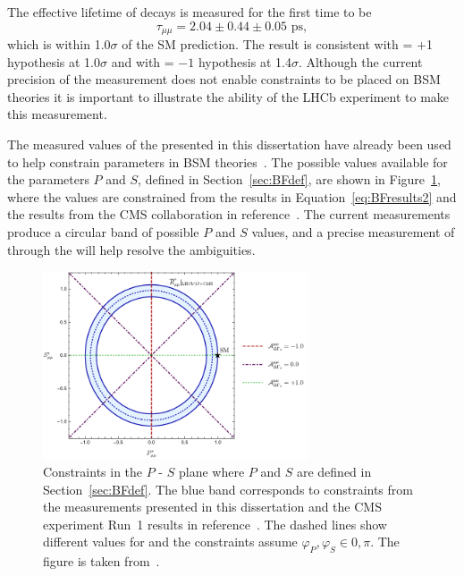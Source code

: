 The effective lifetime of \bsmumu decays is measured for the first time to be 
\begin{equation}
\tau_{\mu\mu} = 2.04 \pm 0.44 \pm 0.05 \text{ ps},
\end{equation}
which is within 1.0$\sigma$ of the SM prediction. The result is consistent with \ADG = +1 hypothesis at 1.0$\sigma$ and with \ADG = $-1$ hypothesis at 1.4$\sigma$. Although the current precision of the measurement does not enable constraints to be placed on BSM theories it is important to illustrate the ability of the LHCb experiment to make this measurement.

The measured values of the \BF presented in this dissertation have already been used to help constrain parameters in BSM theories~\cite{Altmannshofer:2017wqy,Fleischer:2017ltw,Bobeth:2017xry,Chiang:2017etj}. 
The possible values available for the parameters $P$ and $S$, defined in Section~\ref{sec:BFdef}, are shown in Figure~\ref{fig:NPcontss}, where the values are constrained from the \BF results in Equation~\ref{eq:BFresults2} and the results from the CMS collaboration in reference~\cite{Chatrchyan:2013bka}. The current measurements produce a circular band of possible $P$ and $S$ values, and a precise measurement of \ADG through the \bsmumu \el will help resolve the ambiguities.


\begin{figure}[tbp]
    \centering
        \includegraphics[width=0.7\textwidth]{./Figs/Summary/fig3.pdf}
    \caption{Constraints in the $P$ - $S$ plane where $P$ and $S$ are defined in Section~\ref{sec:BFdef}. The blue band corresponds to constraints from the \bmumu \BF measurements presented in this dissertation and the CMS experiment Run~1 results in reference~\cite{Chatrchyan:2013bka}. The dashed lines show different values for \ADG and the constraints assume $\varphi_{P}, \varphi_{S}\in {0, \pi}$. The figure is taken from~\cite{Fleischer:2017ltw}.}
    \label{fig:NPcontss}
\end{figure}



